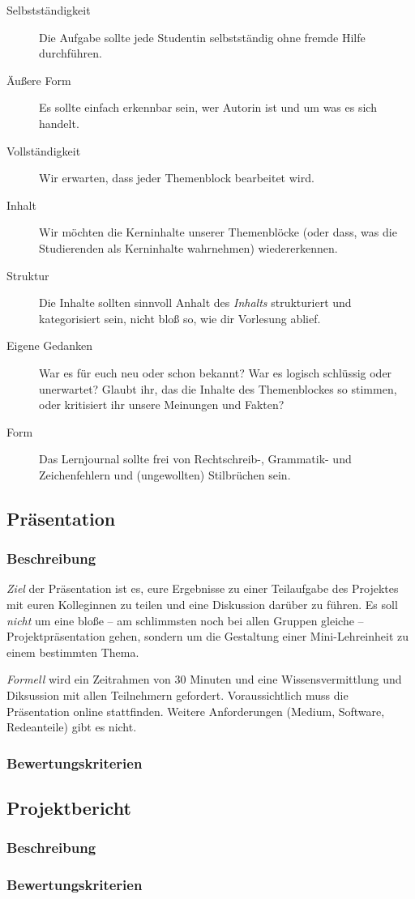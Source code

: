 \documentclass[DIV=15,headinclude]{scrartcl}
\begin{document}
\begin{description}
	\item[Selbstständigkeit] Die Aufgabe sollte jede Studentin selbstständig ohne fremde Hilfe durchführen.
	\item[Äußere Form] Es sollte einfach erkennbar sein, wer Autorin ist und um was es sich handelt.
	\item[Vollständigkeit] Wir erwarten, dass jeder Themenblock bearbeitet wird.
	\item[Inhalt] Wir möchten die Kerninhalte unserer Themenblöcke (oder dass, was die Studierenden als Kerninhalte wahrnehmen) wiedererkennen.
	\item[Struktur] Die Inhalte sollten sinnvoll Anhalt des \emph{Inhalts} strukturiert und kategorisiert sein, nicht bloß so, wie dir Vorlesung ablief.
	\item[Eigene Gedanken] War es für euch neu oder schon bekannt? War es logisch schlüssig oder unerwartet? Glaubt ihr, das die Inhalte des Themenblockes so stimmen, oder kritisiert ihr unsere Meinungen und Fakten?
	\item[Form] Das Lernjournal sollte frei von Rechtschreib-, Grammatik- und Zeichenfehlern und (ungewollten) Stilbrüchen sein.
\end{description}

\subsection{Präsentation}

\subsubsection{Beschreibung}

\emph{Ziel} der Präsentation ist es, eure Ergebnisse zu einer Teilaufgabe des Projektes mit euren Kolleginnen zu teilen und eine Diskussion darüber zu führen. Es soll \emph{nicht} um eine bloße – am schlimmsten noch bei allen Gruppen gleiche – Projektpräsentation gehen, sondern um die Gestaltung einer Mini-Lehreinheit zu einem bestimmten Thema.

\emph{Formell} wird ein Zeitrahmen von 30 Minuten und eine Wissensvermittlung und Diksussion mit allen Teilnehmern gefordert. Voraussichtlich muss die Präsentation online stattfinden. Weitere Anforderungen (Medium, Software, Redeanteile) gibt es nicht.

\subsubsection{Bewertungskriterien}

\subsection{Projektbericht}

\subsubsection{Beschreibung}

\subsubsection{Bewertungskriterien}



\end{document}
